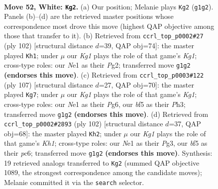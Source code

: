 \documentclass[11pt]{article}
\begin{document}
\clearpage

\begin{figure}[p]\centering
\begin{subfigure}{0.46\textwidth}\centering
\resizebox{\linewidth}{!}{%
\newchessgame
\chessboard[
  setfen={n6Q/8/8/1p3bk1/7p/P2Pq3/8/4N1K1 w - - 3 52},
  showmover=false,
  pgfstyle=straightmove, color=movearrow, markmove={g1-g2}
]}
\caption{}
\end{subfigure}\hfill
\begin{subfigure}{0.46\textwidth}\centering
\resizebox{\linewidth}{!}{%
\newchessgame
\chessboard[
  setfen={3Q4/1k6/8/3b2p1/8/4qP1P/6P1/6K1 w - - 6 52},
  showmover=false,
  pgfstyle=straightmove, color=movearrow, markmove={g1-h1}
]}
\caption{}
\end{subfigure}
\\[4pt]
\begin{subfigure}{0.46\textwidth}\centering
\resizebox{\linewidth}{!}{%
\newchessgame
\chessboard[
  setfen={6k1/8/1p2Q1p1/1P6/8/4KPPp/7q/8 b - - 15 54},
  showmover=false,
  pgfstyle=straightmove, color=movearrow, markmove={g8-g7}
]}
\caption{}
\end{subfigure}\hfill
\begin{subfigure}{0.46\textwidth}\centering
\resizebox{\linewidth}{!}{%
\newchessgame
\chessboard[
  setfen={6k1/1Q5p/2p3p1/2P5/1P6/6PP/8/5q1K w - - 7 52},
  showmover=false,
  pgfstyle=straightmove, color=movearrow, markmove={h1-h2}
]}
\caption{}
\end{subfigure}
\caption{\textbf{Move 52, White: \texttt{Kg2}.} (a) Our position; Melanie plays \texttt{Kg2} (\texttt{g1g2}). Panels (b)--(d) are the retrieved master positions whose correspondence most drove this move (highest QAP objective among those that transfer to it). (b) Retrieved from \texttt{ccrl\_top\_p0002\#27} (ply 102) [structural distance $d$=39, QAP obj=74]: the master played \texttt{Kh1}; under $\mu$ our \emph{Kg1} plays the role of that game's \emph{Kg1}; cross-type roles: our \emph{N}e1 as their \emph{P}g2; transferred move \texttt{g1g2} \textbf{(endorses this move)}. (c) Retrieved from \texttt{ccrl\_top\_p0003\#122} (ply 107) [structural distance $d$=27, QAP obj=70]: the master played \texttt{Kg7}; under $\mu$ our \emph{Kg1} plays the role of that game's \emph{Kg1}; cross-type roles: our \emph{N}e1 as their \emph{P}g6, our \emph{b}f5 as their \emph{P}h3; transferred move \texttt{g1g2} \textbf{(endorses this move)}. (d) Retrieved from \texttt{ccrl\_top\_p0002\#2893} (ply 102) [structural distance $d$=37, QAP obj=68]: the master played \texttt{Kh2}; under $\mu$ our \emph{Kg1} plays the role of that game's \emph{Kh1}; cross-type roles: our \emph{N}e1 as their \emph{P}g3, our \emph{b}f5 as their \emph{p}c6; transferred move \texttt{g1g2} \textbf{(endorses this move)}. Synthesis: 19 retrieved analogs transferred to \texttt{Kg2} (summed QAP objective 1089, the strongest correspondence among the candidate moves); Melanie committed it via the \texttt{search} selector.}
\label{fig:thought-m102}
\end{figure}
\end{document}
